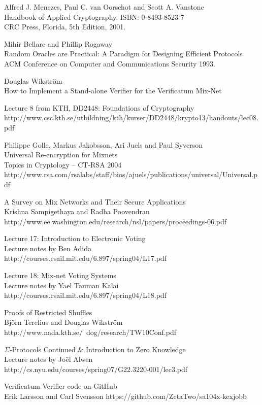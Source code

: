 \clearpage
\begin{thebibliography}{9}

  Alfred J. Menezes, Paul C. van Oorschot and Scott A. Vanstone\\
  Handbook of Applied Cryptography.
  ISBN: 0-8493-8523-7\\
  CRC Press, Florida,
  5th Edition,
  2001.

   Mihir Bellare and Phillip Rogaway\\
   Random Oracles are Practical: A Paradigm for Designing Efficient Protocols\\
   ACM Conference on Computer and Communications Security 1993.

   Douglas Wikström\\
   How to Implement a Stand-alone Verifier for the Verificatum Mix-Net

  Lecture 8 from KTH, DD2448: Foundations of Cryptography\\
  http://www.csc.kth.se/utbildning/kth/kurser/DD2448/krypto13/handouts/lec08.pdf

   Philippe Golle, Markus Jakobsson, Ari Juels and Paul Syverson\\
   Universal Re-encryption for Mixnets\\
   Topics in Cryptology – CT-RSA 2004\\
   http://www.rsa.com/rsalabs/staff/bios/ajuels/publications/universal/Universal.pdf

   A Survey on Mix Networks and Their Secure Applications\\
   Krishna Sampigethaya and Radha Poovendran\\
   http://www.ee.washington.edu/research/nsl/papers/proceedings-06.pdf

   Lecture 17: Introduction to Electronic Voting\\
   Lecture notes by Ben Adida\\
   http://courses.csail.mit.edu/6.897/spring04/L17.pdf

   Lecture 18: Mix-net Voting Systems\\
   Lecture notes by Yael Tauman Kalai\\
   http://courses.csail.mit.edu/6.897/spring04/L18.pdf

   Proofs of Restricted Shuffles\\
   Björn Terelius and Douglas Wikström\\
   http://www.nada.kth.se/~dog/research/TW10Conf.pdf

   $\Sigma$-Protocols Continued \& Introduction to Zero Knowledge\\
   Lecture notes by Joël Alwen\\
   http://cs.nyu.edu/courses/spring07/G22.3220-001/lec3.pdf

   Verificatum Verifier code on GitHub\\
   Erik Larsson and Carl Svensson
   https://github.com/ZetaTwo/sa104x-kexjobb

\end{thebibliography}
